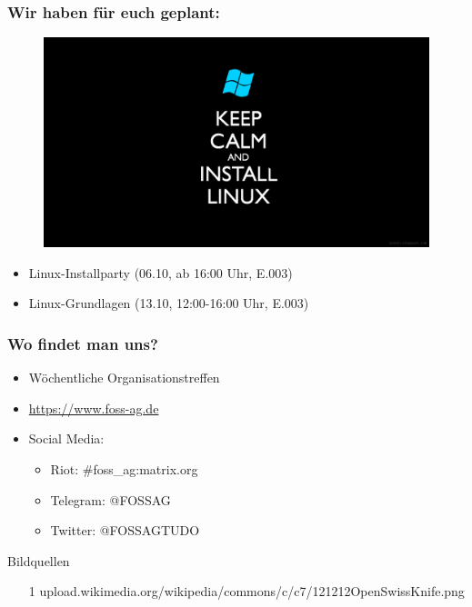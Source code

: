 \begin{frame}
	\frametitle{Wir haben für euch geplant:}
	\begin{figure}
		\includegraphics[scale=0.15]{resources/linuxcalm.png}
	\end{figure}
	\begin{itemize}
		\item Linux-Installparty (06.10, ab 16:00 Uhr, E.003)
		\item Linux-Grundlagen (13.10, 12:00-16:00 Uhr, E.003)
	\end{itemize}
\end{frame}

\begin{frame}
	\frametitle{Wo findet man uns?}
	\begin{itemize}
		\item Wöchentliche Organisationstreffen
		\item \url{https://www.foss-ag.de}
		\item Social Media:
		\begin{itemize}
			\item Riot: \#foss\_ag:matrix.org
			\item Telegram: @FOSSAG
			\item Twitter: @FOSSAGTUDO
		\end{itemize}
	\end{itemize}
\end{frame}

\begin{frame}{Bildquellen}
	\scriptsize{
			\begin{itemize}
			\item [1] upload.wikimedia.org/wikipedia/commons/c/c7/121212\textunderscore OpenSwissKnife.png
		\end{itemize}
	}
\end{frame}
